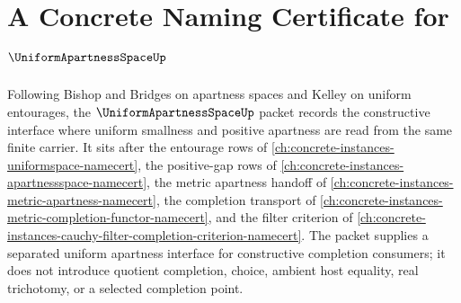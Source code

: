 \chapter{A Concrete Naming Certificate for $\UniformApartnessSpaceUp$}
\label{ch:concrete-instances-uniform-apartness-space-namecert}

Following Bishop and Bridges on apartness spaces and Kelley on uniform
entourages, the $\UniformApartnessSpaceUp$ packet records the constructive
interface where uniform smallness and positive apartness are read from the
same finite carrier. It sits after the entourage rows of
\autoref{ch:concrete-instances-uniformspace-namecert}, the positive-gap rows
of \autoref{ch:concrete-instances-apartnessspace-namecert}, the metric
apartness handoff of \autoref{ch:concrete-instances-metric-apartness-namecert},
the completion transport of
\autoref{ch:concrete-instances-metric-completion-functor-namecert}, and the
filter criterion of
\autoref{ch:concrete-instances-cauchy-filter-completion-criterion-namecert}.
The packet supplies a separated uniform apartness interface for constructive
completion consumers; it does not introduce quotient completion, choice,
ambient host equality, real trichotomy, or a selected completion point.

